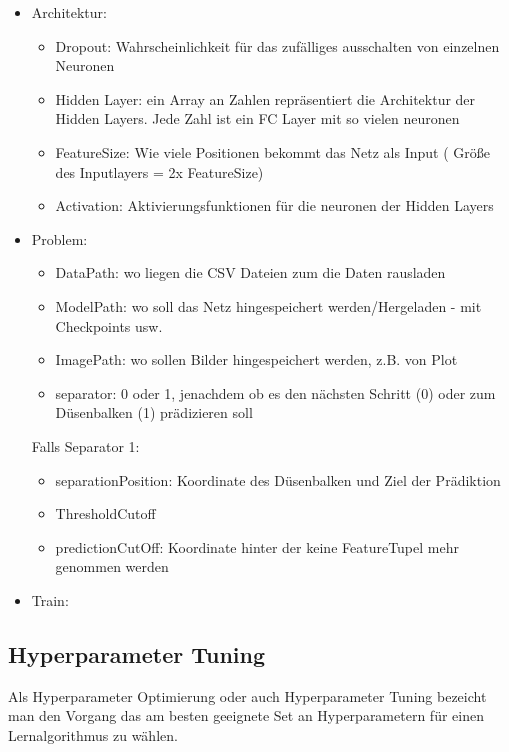 \begin{itemize}
\item Architektur:
    \begin{itemize}
        \item Dropout: Wahrscheinlichkeit für das zufälliges ausschalten von einzelnen Neuronen
        \item Hidden Layer: ein Array an Zahlen repräsentiert die Architektur der Hidden Layers. Jede Zahl ist ein FC Layer mit so vielen neuronen
        \item FeatureSize: Wie viele Positionen bekommt das Netz als Input ( \textrightarrow{} Größe des Inputlayers = 2x FeatureSize)
        \item Activation: Aktivierungsfunktionen für die neuronen der Hidden Layers
    \end{itemize}
\item Problem:
    \begin{itemize}
        \item DataPath: wo liegen die CSV Dateien zum die Daten rausladen
        \item ModelPath: wo soll das Netz hingespeichert werden/Hergeladen - mit Checkpoints usw.
        \item ImagePath: wo sollen Bilder hingespeichert werden, z.B. von Plot
        \item separator: 0 oder 1, jenachdem ob es den nächsten Schritt (0) oder zum Düsenbalken (1) prädizieren soll
    \end{itemize}

    Falls Separator 1:
    \begin{itemize}
        \item separationPosition: Koordinate des Düsenbalken und Ziel der Prädiktion
        \item ThresholdCutoff 
        \item predictionCutOff: Koordinate hinter der keine FeatureTupel mehr genommen werden
    \end{itemize}
\item Train:

\end{itemize}


\subsection{Hyperparameter Tuning}

Als Hyperparameter Optimierung oder auch Hyperparameter Tuning bezeicht man den Vorgang das am besten geeignete Set an 
Hyperparametern für einen Lernalgorithmus zu wählen.



